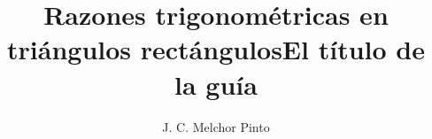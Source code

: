 \documentclass[12pt,addpoints,answers]{guia}
\title{Razones trigonométricas en triángulos rectángulos}
\title{El título de la guía}
\author{J. C. Melchor Pinto}
\begin{document}
\pagestyle{headandfoot}

\INFO
\printanswers
\vspace{-0.9cm}
\begin{multicols}{2}
    \columnbreak
\end{multicols}
%
% 
% 
\begin{questions}
    \questionboxed[10]{}
    \questionboxed[10]{}
    \questionboxed[10]{}
    \questionboxed[10]{}
    \questionboxed[10]{}
    \questionboxed[10]{}
    \questionboxed[10]{}
    \questionboxed[10]{}
    \questionboxed[10]{}
    \questionboxed[10]{}
    \questionboxed[10]{}
    \questionboxed[10]{}
    \questionboxed[10]{}
    \questionboxed[10]{}
    \questionboxed[10]{}
    \questionboxed[10]{}
    \questionboxed[10]{}
    \questionboxed[10]{}
\end{questions}
\end{document}
